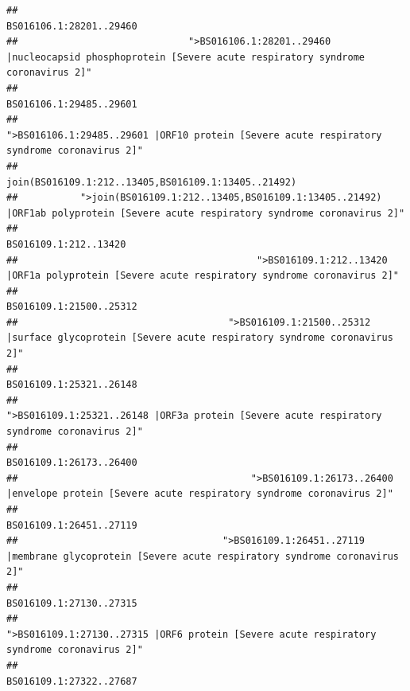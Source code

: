 \documentclass[
]{article}
\begin{document}
\begin{verbatim}
##                                                                                                                BS016106.1:28201..29460 
##                              ">BS016106.1:28201..29460 |nucleocapsid phosphoprotein [Severe acute respiratory syndrome coronavirus 2]" 
##                                                                                                                BS016106.1:29485..29601 
##                                            ">BS016106.1:29485..29601 |ORF10 protein [Severe acute respiratory syndrome coronavirus 2]" 
##                                                                                    join(BS016109.1:212..13405,BS016109.1:13405..21492) 
##           ">join(BS016109.1:212..13405,BS016109.1:13405..21492) |ORF1ab polyprotein [Severe acute respiratory syndrome coronavirus 2]" 
##                                                                                                                  BS016109.1:212..13420 
##                                          ">BS016109.1:212..13420 |ORF1a polyprotein [Severe acute respiratory syndrome coronavirus 2]" 
##                                                                                                                BS016109.1:21500..25312 
##                                     ">BS016109.1:21500..25312 |surface glycoprotein [Severe acute respiratory syndrome coronavirus 2]" 
##                                                                                                                BS016109.1:25321..26148 
##                                            ">BS016109.1:25321..26148 |ORF3a protein [Severe acute respiratory syndrome coronavirus 2]" 
##                                                                                                                BS016109.1:26173..26400 
##                                         ">BS016109.1:26173..26400 |envelope protein [Severe acute respiratory syndrome coronavirus 2]" 
##                                                                                                                BS016109.1:26451..27119 
##                                    ">BS016109.1:26451..27119 |membrane glycoprotein [Severe acute respiratory syndrome coronavirus 2]" 
##                                                                                                                BS016109.1:27130..27315 
##                                             ">BS016109.1:27130..27315 |ORF6 protein [Severe acute respiratory syndrome coronavirus 2]" 
##                                                                                                                BS016109.1:27322..27687 

\end{verbatim}
\end{document}
